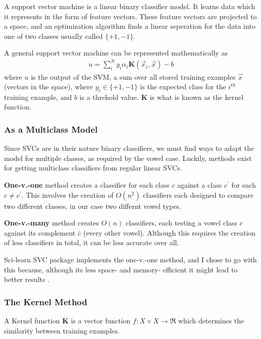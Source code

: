 \documentclass[twoside]{article}
\begin{document}
\begin{multicols}{2}
A support vector machine is a linear binary classifier model.  It learns data which it represents in the form of feature vectors.  These feature vectors are projected to a space, and an optimization algorithm finds a linear seperation for the data into one of two classes usually called $\{+1,-1\}$.

A general support vector machine can be represented mathematically as
\begin{align}
u=\sum_i^N{y_i \alpha_i \boldsymbol{K}(\vec{x}_i, \vec{x}) - b}
\end{align}
where $u$ is the output of the SVM, a sum over all stored training examples $\vec{x}$ (vectors in the space), where $y_i\in\{+1,-1\}$ is the expected class for the $i^{th}$ training example, and $b$ is a threhold value.
$\boldsymbol{K}$ is what is known as the kernel function.

\subsubsection{As a Multiclass Model}

Since SVCs are in their nature binary classifiers, we must find ways to adapt the model for multiple classes, as required by the vowel case.  Luckily, methods exist for getting multiclass classifiers from regular linear SVCs.

\textbf{One-v.-one} method creates a classifier for each class $c$ against a class $c^\prime$ for each $c\neq c^\prime$.  This involves the creation of $O(n^2)$ classifiers each designed to compare two different classes, in our case two differnt vowel types. 

\textbf{One-v.-many} method creates $O(n)$ classifiers, each testing a vowel class $c$ against its complement $\bar{c}$ (every other vowel). Although this requires the creation of less classifiers in total, it can be less accurate over all.

Sci-learn SVC package implements the one-v.-one method, and I chose to go with this because, although its less space- and memory- efficient it might lead to better results \cite{smo}.

\subsubsection{The Kernel Method}

A Kernel function $\boldsymbol{K}$ is a vector function $f:X\times X\rightarrow\Re$ which determines the similarity between training examples.


\end{multicols}
\end{document}
